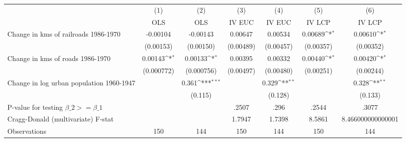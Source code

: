 {
\def\sym#1{\ifmmode^{#1}\else\(^{#1}\)\fi}
\begin{tabular}{l*{6}{c}}
\hline\hline
                &\multicolumn{1}{c}{(1)}&\multicolumn{1}{c}{(2)}&\multicolumn{1}{c}{(3)}&\multicolumn{1}{c}{(4)}&\multicolumn{1}{c}{(5)}&\multicolumn{1}{c}{(6)}\\
                &\multicolumn{1}{c}{OLS}&\multicolumn{1}{c}{OLS}&\multicolumn{1}{c}{IV EUC}&\multicolumn{1}{c}{IV EUC}&\multicolumn{1}{c}{IV LCP}&\multicolumn{1}{c}{IV LCP}\\
\hline
Change in kms of railroads 1986-1970& -0.00104         & -0.00143         &  0.00647         &  0.00534         &  0.00689\sym{*}  &  0.00610\sym{*}  \\
                &(0.00153)         &(0.00150)         &(0.00489)         &(0.00457)         &(0.00357)         &(0.00352)         \\
[1em]
Change in kms of roads 1986-1970&  0.00143\sym{*}  &  0.00133\sym{*}  &  0.00395         &  0.00332         &  0.00440\sym{*}  &  0.00420\sym{*}  \\
                &(0.000772)         &(0.000756)         &(0.00497)         &(0.00480)         &(0.00251)         &(0.00244)         \\
[1em]
Change in log urban population 1960-1947&                  &    0.361\sym{***}&                  &    0.329\sym{**} &                  &    0.328\sym{**} \\
                &                  &  (0.115)         &                  &  (0.128)         &                  &  (0.133)         \\
\hline
P-value for testing $\beta\_{2} >= \beta\_{1}$&                  &                  &    .2507         &     .296         &    .2544         &    .3077         \\
Cragg-Donald (multivariate) F-stat&                  &                  &   1.7947         &   1.7398         &   8.5861         &8.466000000000001         \\
Observations    &      150         &      144         &      150         &      144         &      150         &      144         \\
\hline\hline
\end{tabular}
}
